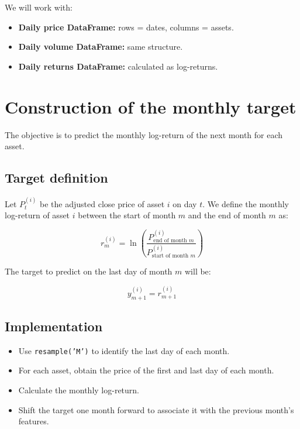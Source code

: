 \documentclass[12pt]{article}
\begin{document}
We will work with:

\begin{itemize}
    \item \textbf{Daily price DataFrame:} rows = dates, columns = assets.
    \item \textbf{Daily volume DataFrame:} same structure.
    \item \textbf{Daily returns DataFrame:} calculated as log-returns.
\end{itemize}

\section{Construction of the monthly target}

The objective is to predict the monthly log-return of the next month for each asset.

\subsection{Target definition}

Let $P_{t}^{(i)}$ be the adjusted close price of asset $i$ on day $t$.  
We define the monthly log-return of asset $i$ between the start of month $m$ and the end of month $m$ as:



\[
r_{m}^{(i)} = \ln\left(\frac{P_{\text{end of month } m}^{(i)}}{P_{\text{start of month } m}^{(i)}}\right)
\]



The target to predict on the last day of month $m$ will be:



\[
y_{m+1}^{(i)} = r_{m+1}^{(i)}
\]



\subsection{Implementation}

\begin{itemize}
    \item Use \texttt{resample('M')} to identify the last day of each month.
    \item For each asset, obtain the price of the first and last day of each month.
    \item Calculate the monthly log-return.
    \item Shift the target one month forward to associate it with the previous month's features.
\end{itemize}
\end{document}
